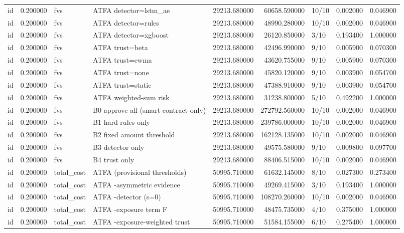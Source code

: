 \begin{tabular}{lrllrrlrr}
id & 0.200000 & fvs & ATFA detector=lstm\_ae & 29213.680000 & 60658.590000 & 10/10 & 0.002000 & 0.046900 \\
id & 0.200000 & fvs & ATFA detector=rules & 29213.680000 & 48990.280000 & 10/10 & 0.002000 & 0.046900 \\
id & 0.200000 & fvs & ATFA detector=xgboost & 29213.680000 & 26120.850000 & 3/10 & 0.193400 & 1.000000 \\
id & 0.200000 & fvs & ATFA trust=beta & 29213.680000 & 42496.990000 & 9/10 & 0.005900 & 0.070300 \\
id & 0.200000 & fvs & ATFA trust=ewma & 29213.680000 & 43620.755000 & 9/10 & 0.005900 & 0.070300 \\
id & 0.200000 & fvs & ATFA trust=none & 29213.680000 & 45820.120000 & 9/10 & 0.003900 & 0.054700 \\
id & 0.200000 & fvs & ATFA trust=static & 29213.680000 & 47388.910000 & 9/10 & 0.003900 & 0.054700 \\
id & 0.200000 & fvs & ATFA weighted-sum risk & 29213.680000 & 31238.800000 & 5/10 & 0.492200 & 1.000000 \\
id & 0.200000 & fvs & B0 approve all (smart contract only) & 29213.680000 & 272792.560000 & 10/10 & 0.002000 & 0.046900 \\
id & 0.200000 & fvs & B1 hard rules only & 29213.680000 & 239786.000000 & 10/10 & 0.002000 & 0.046900 \\
id & 0.200000 & fvs & B2 fixed amount threshold & 29213.680000 & 162128.135000 & 10/10 & 0.002000 & 0.046900 \\
id & 0.200000 & fvs & B3 detector only & 29213.680000 & 49575.580000 & 9/10 & 0.009800 & 0.097700 \\
id & 0.200000 & fvs & B4 trust only & 29213.680000 & 88406.515000 & 10/10 & 0.002000 & 0.046900 \\
id & 0.200000 & total\_cost & ATFA (provisional thresholds) & 50995.710000 & 61632.145000 & 8/10 & 0.027300 & 0.273400 \\
id & 0.200000 & total\_cost & ATFA -asymmetric evidence & 50995.710000 & 49269.415000 & 3/10 & 0.193400 & 1.000000 \\
id & 0.200000 & total\_cost & ATFA -detector (s=0) & 50995.710000 & 108270.260000 & 10/10 & 0.002000 & 0.046900 \\
id & 0.200000 & total\_cost & ATFA -exposure term F & 50995.710000 & 48475.735000 & 4/10 & 0.375000 & 1.000000 \\
id & 0.200000 & total\_cost & ATFA -exposure-weighted trust & 50995.710000 & 51584.155000 & 6/10 & 0.275400 & 1.000000 \\

\end{tabular}
